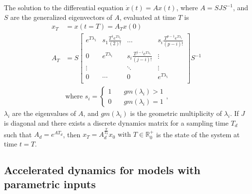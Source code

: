 \documentclass[sigconf]{llncs}
\newcommand{\mat}[1]{{#1}}
\renewcommand{\vec}[1]{{#1}}
\begin{document}
\begin{lemma}
The solution to the differential equation $\dot{\vec{x}}(t)=\mat{A}\vec{x}(t)$, where $\mat{A}=\mat{S}\mat{J}\mat{S}^{-1}$, and $\mat{S}$ are the generalized eigenvectors of $\mat{A}$,
evaluated at time $T$ is
%
\begin{align}
 \vec{x}_T&=\vec{x}(t=T)=\mat{A}_{T}\vec{x} (0)\\
 \mat{A}_{T}&= \mat{S}
 \left [ \begin{array}{cccc}
 e^{T\lambda_1}  & s_1\frac{T^{1}e^{T\lambda_i}}{(2)!} & \hdots  & s_i\frac{T^{p-1}e^{T\lambda_i}}{(p-i)!} \\
0 & e^{T\lambda_i}  & s_i\frac{T^{j-i}e^{T\lambda_i}}{(j-i)!} & \vdots \\
\vdots & & \ddots & \vdots \\
0 & \cdots & 0  &e^{T\lambda_i} \\
\end{array} \right ]
 \mat{S}^{-1}
 \label{eq:continuous_tube_dyn2}\\
 &\text{where } s_i=\left\{\begin{array}{cc}1&\quad gm(\lambda_i)>1\\0&\quad gm(\lambda_i)=1\end{array}\right.,\nonumber
\end{align}
%
$\lambda_i$ are the eigenvalues of $\mat{A}$, and $gm(\lambda_i)$ is the geometric multiplicity of $\lambda_i$.
%
If $\mat{J}$ is diagonal and there exists a discrete dynamics matrix for a sampling time $T_d$ such that $A_d=e^{\mat{A} T_d}$, then $\vec{x}_T=A_d^{\frac{T}{T_d}}\vec{x}_0 \text{ with } T \in \mathbb{R}^+_0$ is the state of the system at time $t=T$. 
\end{lemma}

\subsection{Accelerated dynamics for models with parametric inputs}\label{sec:real_discrete_param_inputs}
\end{document}
